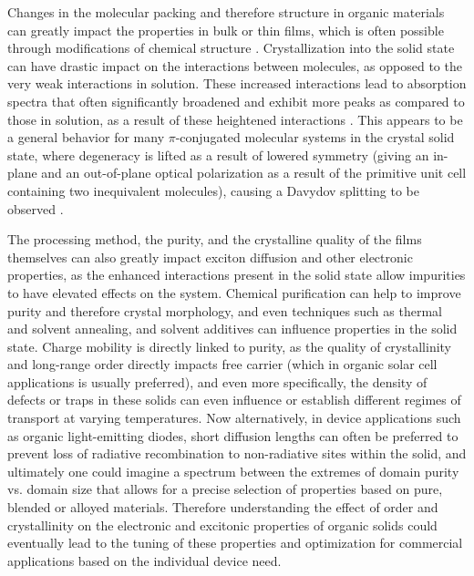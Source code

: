 Changes in the molecular packing and therefore structure in organic materials can greatly impact the properties in bulk or thin films, which is often possible through modifications of chemical structure \cite{Forrest2007} \cite{Sergeyev2007}.  Crystallization into the solid state can have drastic impact on the interactions between molecules, as opposed to the very weak interactions in solution\cite{Simpson2004}.  These increased interactions lead to absorption spectra that often significantly broadened and exhibit more peaks as compared to those in solution, as a result of these heightened interactions \cite{Grobosch2010} \cite{Sharp1973} \cite{Peisert2002}.  This appears to be a general behavior for many $\pi$-conjugated molecular systems in the crystal solid state, where degeneracy is lifted as a result of lowered symmetry (giving an in-plane and an out-of-plane optical polarization as a result of the primitive unit cell containing two inequivalent molecules), causing a Davydov splitting to be observed\cite{Hollebone1974} \cite{Davydov1962} \cite{Knupfer2004} \cite{Yamagata2011}.



The processing method, the purity, and the crystalline quality of the films themselves can also greatly impact exciton diffusion and other electronic properties, as the enhanced interactions present in the solid state allow impurities to have elevated effects on the system\cite{Bardeen2014}. Chemical purification can help to improve purity and therefore crystal morphology, and even techniques such as thermal and solvent annealing, and solvent additives can influence properties in the solid state\cite{Mukherjee2015}. Charge mobility is directly linked to purity, as the quality of crystallinity and long-range order directly impacts free carrier\cite{Lunt2010} (which in organic solar cell applications is usually preferred), and even more specifically, the density of defects or traps in these solids can even influence or establish different regimes of transport at varying temperatures\cite{Podzorov2010}\cite{Lin2015}.  Now alternatively, in device applications such as organic light-emitting diodes, short diffusion lengths can often be preferred to prevent loss of radiative recombination to non-radiative sites within the solid\cite{Lin2015}, and ultimately one could imagine a spectrum between the extremes of domain purity vs. domain size that allows for a precise selection of properties based on pure, blended or alloyed materials\cite{Mukherjee2015}. Therefore understanding the effect of order and crystallinity on the electronic and excitonic properties of organic solids could eventually lead to the tuning of these properties and optimization for commercial applications based on the individual device need\cite{Lunt2010}.







